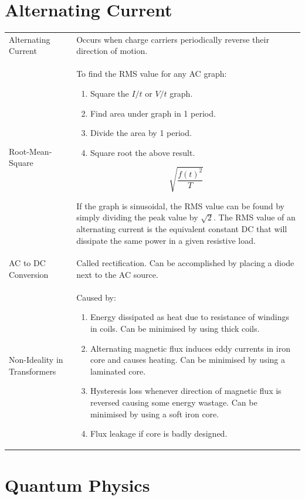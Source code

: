 \documentclass[a4paper,11pt]{article}
\begin{document}
	\section{Alternating Current}
	\begin{center}
		\renewcommand{\arraystretch}{1.8}
		\begin{tabular}{@{} l p{9.5cm} @{}}
			\toprule
			Alternating Current & Occurs when charge carriers periodically reverse their direction of motion.\\
			Root-Mean-Square & To find the RMS value for any AC graph: \begin{enumerate}
				\item Square the $I/t$ or $V/t$ graph.
				\item Find area under graph in 1 period.
				\item Divide the area by 1 period.
				\item Square root the above result.
			\end{enumerate}\par
			$$\sqrt{\frac{f(t)^2}{T}}$$
			\par
			If the graph is sinusoidal, the RMS value can be found by simply dividing the peak value by $\sqrt{2}$. The RMS value of an alternating current is the equivalent constant DC that will dissipate the same power in a given resistive load.\\
			AC to DC Conversion & Called rectification. Can be accomplished by placing a diode next to the AC source.\\
			Non-Ideality in Transformers & Caused by:
			\begin{enumerate}
				\item Energy dissipated as heat due to resistance of windings in coils. Can be minimised by using thick coils. 
				\item Alternating magnetic flux induces eddy currents in iron core and causes heating. Can be minimised by using a laminated core.
				\item Hysteresis loss whenever direction of magnetic flux is reversed causing some energy wastage. Can be minimised by using a soft iron core.
				\item Flux leakage if core is badly designed.
			\end{enumerate}\\
			\bottomrule
		\end{tabular}
	\end{center}
	\newpage
	\section{Quantum Physics}
\end{document}
